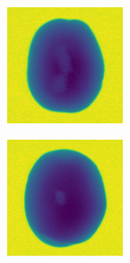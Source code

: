 \documentclass[11pt]{article}
\begin{document}
\begin{figure}[!h]
\begin{subfigure}[b]{0.22\textwidth}
         \caption{}
         \label{fig:hollow_15}
     \end{subfigure}
          \\
    \begin{subfigure}[b]{0.22\textwidth}
         \centering
         \includegraphics[width=\textwidth]{figurer/potato_dataset/hollow/hollow_16.jpg}
         \caption{}
         \label{fig:hollow_16}
     \end{subfigure}
     \hfill
     \begin{subfigure}[b]{0.22\textwidth}
         \centering
         \includegraphics[width=\textwidth]{figurer/potato_dataset/hollow/hollow_17.jpg}

\end{subfigure}
\end{figure}
\end{document}
